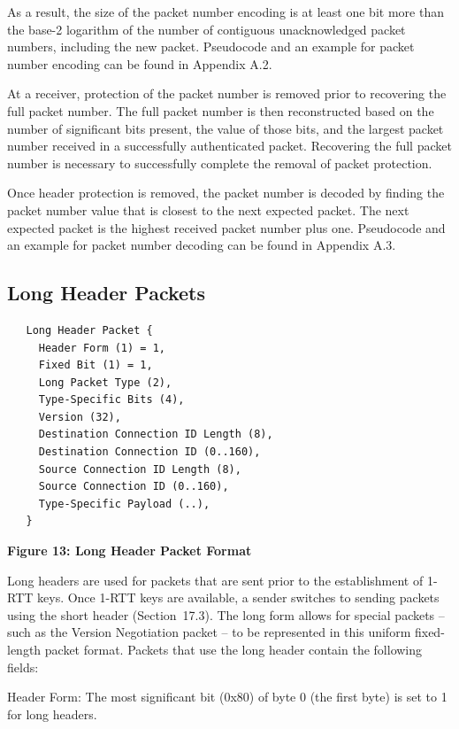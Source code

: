 \documentclass{article}
\begin{document}
As a result, the size of the packet number encoding is at least one bit more than the base-2 logarithm of the number of contiguous unacknowledged packet numbers, including the new packet.  Pseudocode and an example for packet number encoding can be found in Appendix A.2.

At a receiver, protection of the packet number is removed prior to recovering the full packet number.  The full packet number is then reconstructed based on the number of significant bits present, the value of those bits, and the largest packet number received in a successfully authenticated packet.  Recovering the full packet number is necessary to successfully complete the removal of packet protection.

Once header protection is removed, the packet number is decoded by finding the packet number value that is closest to the next expected packet.  The next expected packet is the highest received packet number plus one.  Pseudocode and an example for packet number decoding can be found in Appendix A.3.

\subsection{Long Header Packets}

\begin{verbatim}
   Long Header Packet {
     Header Form (1) = 1,
     Fixed Bit (1) = 1,
     Long Packet Type (2),
     Type-Specific Bits (4),
     Version (32),
     Destination Connection ID Length (8),
     Destination Connection ID (0..160),
     Source Connection ID Length (8),
     Source Connection ID (0..160),
     Type-Specific Payload (..),
   }
\end{verbatim}

\begin{center}
\textbf{Figure 13: Long Header Packet Format}
\end{center}

Long headers are used for packets that are sent prior to the establishment of 1-RTT keys.  Once 1-RTT keys are available, a sender switches to sending packets using the short header (Section~17.3). The long form allows for special packets -- such as the Version Negotiation packet -- to be represented in this uniform fixed-length packet format.  Packets that use the long header contain the following fields:

Header Form:  The most significant bit (0x80) of byte 0 (the first byte) is set to 1 for long headers.
\end{document}
